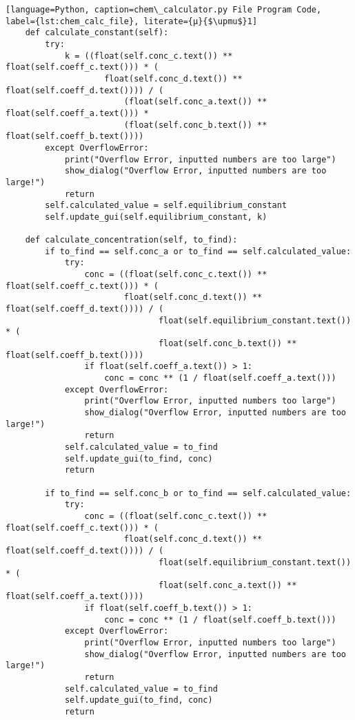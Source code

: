\begin{lstlisting}[language=Python, caption=chem\_calculator.py File Program Code, label={lst:chem_calc_file}, literate={μ}{$\upmu$}1]
    def calculate_constant(self):
        try:
            k = ((float(self.conc_c.text()) ** float(self.coeff_c.text())) * (
                    float(self.conc_d.text()) ** float(self.coeff_d.text()))) / (
                        (float(self.conc_a.text()) ** float(self.coeff_a.text())) *
                        (float(self.conc_b.text()) ** float(self.coeff_b.text())))
        except OverflowError:
            print("Overflow Error, inputted numbers are too large")
            show_dialog("Overflow Error, inputted numbers are too large!")
            return
        self.calculated_value = self.equilibrium_constant
        self.update_gui(self.equilibrium_constant, k)

    def calculate_concentration(self, to_find):
        if to_find == self.conc_a or to_find == self.calculated_value:
            try:
                conc = ((float(self.conc_c.text()) ** float(self.coeff_c.text())) * (
                        float(self.conc_d.text()) ** float(self.coeff_d.text()))) / (
                               float(self.equilibrium_constant.text()) * (
                               float(self.conc_b.text()) ** float(self.coeff_b.text())))
                if float(self.coeff_a.text()) > 1:
                    conc = conc ** (1 / float(self.coeff_a.text()))
            except OverflowError:
                print("Overflow Error, inputted numbers too large")
                show_dialog("Overflow Error, inputted numbers are too large!")
                return
            self.calculated_value = to_find
            self.update_gui(to_find, conc)
            return

        if to_find == self.conc_b or to_find == self.calculated_value:
            try:
                conc = ((float(self.conc_c.text()) ** float(self.coeff_c.text())) * (
                        float(self.conc_d.text()) ** float(self.coeff_d.text()))) / (
                               float(self.equilibrium_constant.text()) * (
                               float(self.conc_a.text()) ** float(self.coeff_a.text())))
                if float(self.coeff_b.text()) > 1:
                    conc = conc ** (1 / float(self.coeff_b.text()))
            except OverflowError:
                print("Overflow Error, inputted numbers too large")
                show_dialog("Overflow Error, inputted numbers are too large!")
                return
            self.calculated_value = to_find
            self.update_gui(to_find, conc)
            return


\end{lstlisting}
